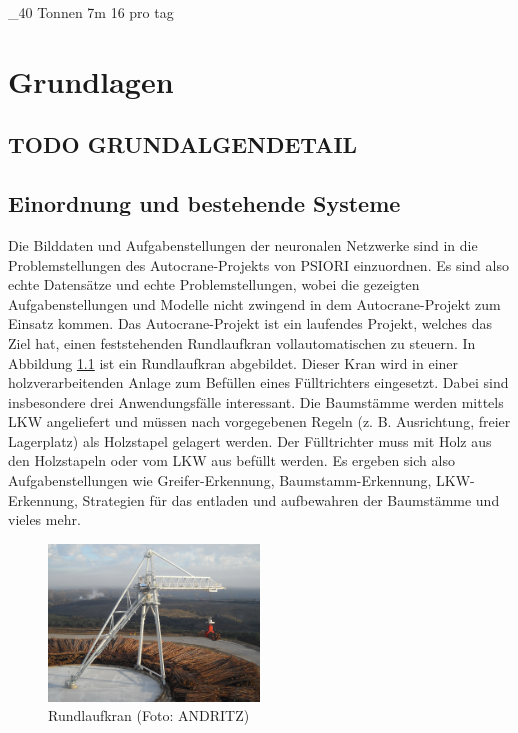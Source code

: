 \_40 Tonnen
7m
16 pro tag





\chapter{Grundlagen}
\label{chap:Grundlagen}

	\section{TODO GRUNDALGENDETAIL}
	\label{sec:TODOGrundlagenDetail}
		
	\section{Einordnung und bestehende Systeme}
	\label{sec:BestehendesSystem}
	Die Bilddaten und Aufgabenstellungen der neuronalen Netzwerke sind in die Problemstellungen des Autocrane-Projekts von PSIORI einzuordnen. Es sind also echte Datensätze und echte Problemstellungen, wobei die gezeigten Aufgabenstellungen und Modelle nicht zwingend in dem Autocrane-Projekt zum Einsatz kommen. Das Autocrane-Projekt ist ein laufendes Projekt, welches das Ziel hat, einen feststehenden Rundlaufkran vollautomatischen zu steuern. In Abbildung \ref{img:CircularCrane} ist ein Rundlaufkran abgebildet. Dieser Kran wird in einer holzverarbeitenden Anlage zum Befüllen eines Fülltrichters eingesetzt. Dabei sind insbesondere drei Anwendungsfälle interessant. Die Baumstämme werden mittels LKW angeliefert und müssen nach vorgegebenen Regeln (z. B. Ausrichtung, freier Lagerplatz) als Holzstapel gelagert werden. Der Fülltrichter muss mit Holz aus den Holzstapeln oder vom LKW aus befüllt werden. Es ergeben sich also Aufgabenstellungen wie Greifer-Erkennung, Baumstamm-Erkennung, LKW-Erkennung, Strategien für das entladen und aufbewahren der Baumstämme und vieles mehr. \cite{PSIORIGmbH.2019}
	\begin{figure}[h]
		\centering
		\includegraphics[width=0.5\textwidth, center]{bilder/Grundlagen/Kran_vollstaendig_N1_030.jpg}
		\caption[Rund-Kran]{Rundlaufkran (Foto: ANDRITZ)}
		\label{img:CircularCrane}
	\end{figure}		

